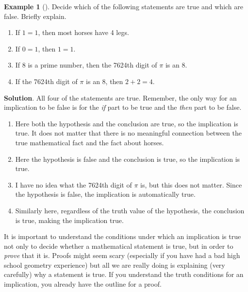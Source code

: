 \documentclass[10pt,]{book}
\theoremstyle{plain}
\theoremstyle{definition}
\theoremstyle{definition}
\newtheorem{example}[theorem]{Example}
\theoremstyle{definition}
\theoremstyle{definition}
\numberwithin{equation}{chapter}
\begin{document}
\begin{example}[]\label{example-32}
\hypertarget{p-1386}{}%
Decide which of the following statements are true and which are false. Briefly explain. \leavevmode%
\begin{enumerate}
\item\hypertarget{li-287}{}\hypertarget{p-1387}{}%
If \(1=1\), then most horses have 4 legs.%
\item\hypertarget{li-288}{}\hypertarget{p-1388}{}%
If \(0=1\), then \(1=1\).%
\item\hypertarget{li-289}{}\hypertarget{p-1389}{}%
If 8 is a prime number, then the 7624th digit of \(\pi\) is an 8.%
\item\hypertarget{li-290}{}\hypertarget{p-1390}{}%
If the 7624th digit of \(\pi\) is an 8, then \(2+2 = 4\).%
\end{enumerate}
%
\par\smallskip%
\noindent\textbf{Solution}.\hypertarget{solution-119}{}\quad%
\hypertarget{p-1391}{}%
All four of the statements are true. Remember, the only way for an implication to be false is for the \emph{if} part to be true and the \emph{then} part to be false. \leavevmode%
\begin{enumerate}
\item\hypertarget{li-291}{}\hypertarget{p-1392}{}%
Here both the hypothesis and the conclusion are true, so the implication is true. It does not matter that there is no meaningful connection between the true mathematical fact and the fact about horses.%
\item\hypertarget{li-292}{}\hypertarget{p-1393}{}%
Here the hypothesis is false and the conclusion is true, so the implication is true.%
\item\hypertarget{li-293}{}\hypertarget{p-1394}{}%
I have no idea what the 7624th digit of \(\pi\) is, but this does not matter. Since the hypothesis is false, the implication is automatically true.%
\item\hypertarget{li-294}{}\hypertarget{p-1395}{}%
Similarly here, regardless of the truth value of the hypothesis, the conclusion is true, making the implication true.%
\end{enumerate}
%
\end{example}
\hypertarget{p-1396}{}%
It is important to understand the conditions under which an implication is true not only to decide whether a mathematical statement is true, but in order to \emph{prove} that it is. Proofs might seem scary (especially if you have had a bad high school geometry experience) but all we are really doing is explaining (very carefully) why a statement is true. If you understand the truth conditions for an implication, you already have the outline for a proof.%
\end{document}
